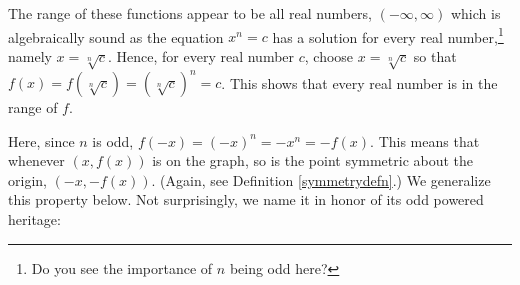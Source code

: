 \documentclass{ximera}
\begin{document}









The range of these functions appear to be all real numbers, $(-\infty, \infty)$ which is algebraically sound as the equation $x^n = c$ has a solution for every real number,\footnote{Do you see the importance of $n$ being odd here?} namely $x = \sqrt[n]{c}$.  Hence, for every real number $c$,  choose $x = \sqrt[n]{c}$ so that $f(x) = f(\sqrt[n]{c}) = (\sqrt[n]{c})^n =c$.  This shows that every real number is in the range of $f$.



Here, since $n$ is odd,  $f(-x) = (-x)^n = -x^n = -f(x)$.  This means that whenever $(x, f(x))$ is on the graph, so is the point symmetric about the origin,  $(-x, -f(x))$. (Again, see Definition \ref{symmetrydefn}.) We generalize this property below.  Not surprisingly, we name it in honor of its odd powered heritage:


\end{document}
